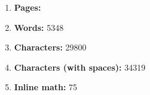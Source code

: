 \begin{enumerate}[itemsep = 0.1 pt]

      \item{
            \textbf{Pages:} 
            }




      \item{
            \textbf{Words:} 5348
            }

      \item{
            \textbf{Characters:} 29800
            }
      \item{
            \textbf{Characters (with spaces):} 34319
            }
      \item{
            \textbf{Inline math:} 75
            }

\end{enumerate}
